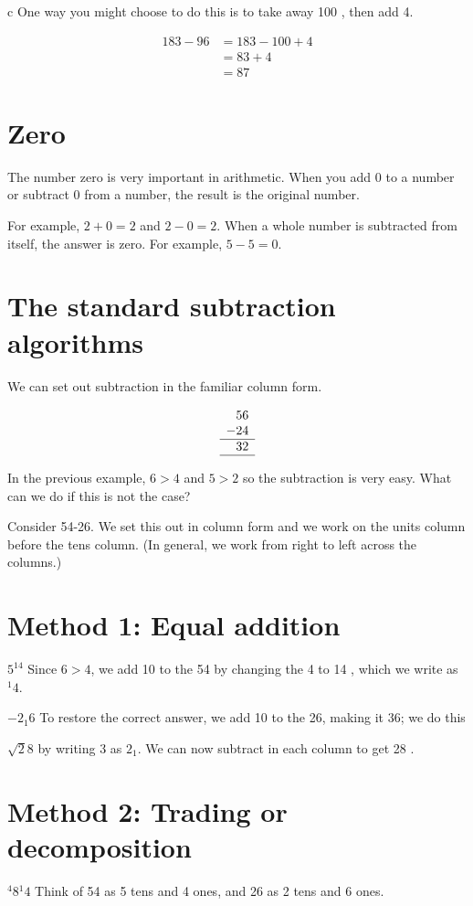 \documentclass[10pt]{article}
\begin{document}
c One way you might choose to do this is to take away 100 , then add 4.

\[
\begin{aligned}
183-96 & =183-100+4 \\
& =83+4 \\
& =87
\end{aligned}
\]

\section*{Zero}
The number zero is very important in arithmetic. When you add 0 to a number or subtract 0 from a number, the result is the original number.

For example, \(2+0=2\) and \(2-0=2\). When a whole number is subtracted from itself, the answer is zero. For example, \(5-5=0\).

\section*{The standard subtraction algorithms}
We can set out subtraction in the familiar column form.

\[
\begin{array}{r}
56 \\
-24 \\
\hline 32 \\
\hline
\end{array}
\]

In the previous example, \(6>4\) and \(5>2\) so the subtraction is very easy. What can we do if this is not the case?

Consider 54-26. We set this out in column form and we work on the units column before the tens column. (In general, we work from right to left across the columns.)

\section*{Method 1: Equal addition}
\(5^{14}\) Since \(6>4\), we add 10 to the 54 by changing the 4 to 14 , which we write as \({ }^{1} 4\).

\(-2_{1} 6\) To restore the correct answer, we add 10 to the 26, making it 36; we do this

\(\sqrt{2} 8\) by writing 3 as \(2_{1}\). We can now subtract in each column to get 28 .

\section*{Method 2: Trading or decomposition}
\({ }^{4} 8{ }^{1} 4\) Think of 54 as 5 tens and 4 ones, and 26 as 2 tens and 6 ones.
\end{document}
